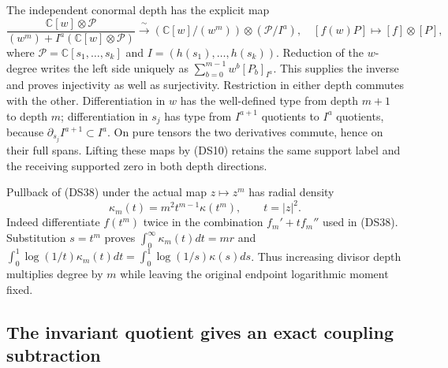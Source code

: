 \documentclass{article}
\begin{document}
The independent conormal depth has the explicit map
\[
 \frac{\mathbb C[w]\otimes\mathcal P}
 {(w^m)+I^a(\mathbb C[w]\otimes\mathcal P)}
 \xrightarrow{\ \sim\ }
 (\mathbb C[w]/(w^m))\otimes(\mathcal P/I^a),
 \quad [f(w)P]\mapsto[f]\otimes[P],
 \tag{DS51}
\]
where $\mathcal P=\mathbb C[s_1,\ldots,s_k]$ and
$I=(h(s_1),\ldots,h(s_k))$.  Reduction of the $w$-degree writes
the left side uniquely as $\sum_{b=0}^{m-1}w^b[P_b]_{I^a}$.
This supplies the inverse and proves injectivity as well as
surjectivity.  Restriction in either depth commutes with the other.
Differentiation in $w$ has the well-defined type from depth $m+1$
to depth $m$; differentiation in $s_j$ has type from $I^{a+1}$
quotients to $I^a$ quotients, because
$\partial_{s_j}I^{a+1}\subset I^a$.  On pure tensors the two
derivatives commute, hence on their full spans.  Lifting these maps
by (DS10) retains the same support label and the receiving supported
zero in both depth directions.

Pullback of (DS38) under the actual map $z\mapsto z^m$ has radial
density
\[
 \kappa_m(t)=m^2t^{m-1}\kappa(t^m),\qquad t=|z|^2.
 \tag{DS52}
\]
Indeed differentiate $f(t^m)$ twice in the combination
$f_m'+tf_m''$ used in (DS38).  Substitution $s=t^m$ proves
$\int_0^\infty\kappa_m(t)dt=mr$ and
$\int_0^1\log(1/t)\kappa_m(t)dt
=\int_0^1\log(1/s)\kappa(s)ds$.
Thus increasing divisor depth multiplies degree by $m$ while
leaving the original endpoint logarithmic moment fixed.

\subsection{The invariant quotient gives an exact coupling subtraction}
\end{document}
